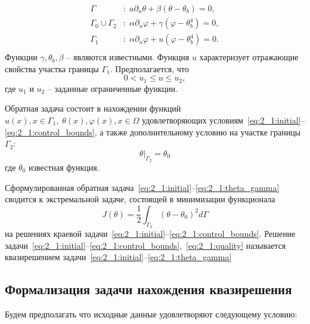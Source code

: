 \begin{equation}
    \label{eq:2_1:initial-boundary}
    \begin{aligned}
        \Gamma &: \; a \partial_n \theta + \beta (\theta - \theta _b) = 0, \\
        \Gamma_0 \cup \Gamma_2 &: \; \alpha \partial_n \varphi
        + \gamma(\varphi - \theta_b ^4 ) = 0, \\
        \Gamma_1 &: \; \alpha \partial_n \varphi + u(\varphi - \theta_b ^4 ) = 0. \\
    \end{aligned}
\end{equation}
Функции $\gamma, \theta_b, \beta$ -- являются известными.
Функция $u$ характеризует отражающие свойства участка границы $\Gamma_1$.
Предполагается, что
\begin{equation}
    \label{eq:2_1:control_bounds}
    0 < u_1 \leq u \leq u_2,
\end{equation}
где $u_1$ и $u_2$ -- заданные ограниченные функции.


Обратная задача состоит в нахождении функций $u(x), x \in  \Gamma_1, \; \theta(x), \varphi(x), x \in \Omega $
удовлетворяющих условиям~\eqref{eq:2_1:initial}--\eqref{eq:2_1:control_bounds},
а также дополнительному условию на участке границы $\Gamma_2$:
\begin{equation}
    \label{eq:2_1:theta_gamma}
    \theta|_{\Gamma_2}=\theta_0
\end{equation}
где $\theta_0$ известная функция.


Сформулированная обратная задача~\eqref{eq:2_1:initial}--\eqref{eq:2_1:theta_gamma}
сводится к экстремальной задаче,
состоящей в минимизации функционала
\begin{equation}
    \label{eq:2_1:quality}
    J(\theta) = \frac{1}{2} \int_{\Gamma_2} (\theta - \theta_0)^2 d\Gamma
\end{equation}
на решениях краевой задачи~\eqref{eq:2_1:initial}--\eqref{eq:2_1:control_bounds}.
Решение задачи~\eqref{eq:2_1:initial}--\eqref{eq:2_1:control_bounds},~\eqref{eq:2_1:quality}
называется квазирешением задачи~\eqref{eq:2_1:initial}--\eqref{eq:2_1:theta_gamma}

\subsection{Формализация задачи нахождения квазирешения}\label{subsec:ch2/sec1/subsec2}


Будем предполагать что исходные данные удовлетворяют следующему условию:

